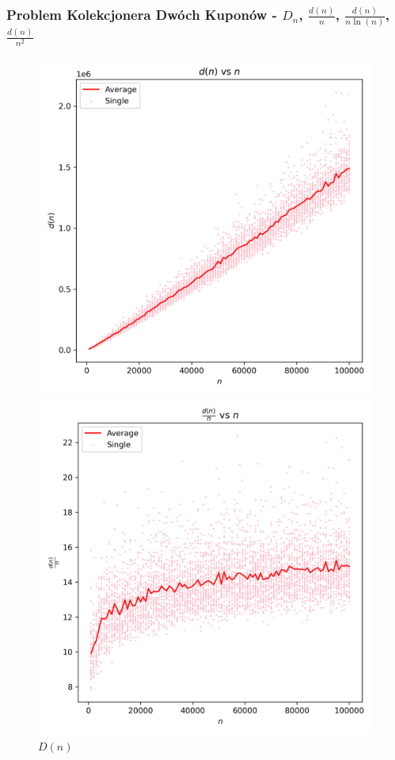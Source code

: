 \documentclass{article}
\begin{document}
\subsubsection{Problem Kolekcjonera Dwóch Kuponów - $D_n$, $\frac{d(n)}{n}$, $\frac{d(n)}{n\ln(n)}$, $\frac{d(n)}{n^2}$}

\begin{figure}[H]
    \centering
    \begin{minipage}{0.24\textwidth}
        \centering
        \includegraphics[width=\linewidth]{graphs/d_factor_vs_n.png}
        \caption{$D(n)$}
    \end{minipage}
    \begin{minipage}{0.24\textwidth}
        \centering
        \includegraphics[width=\linewidth]{graphs/d_factor_over_n_vs_n.png}

\end{minipage}
\end{figure}
\end{document}
